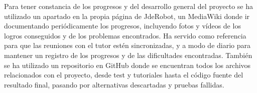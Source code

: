 Para tener constancia de los progresos y del desarrollo general del proyecto se ha utilizado un apartado en la propia página de JdeRobot, un MediaWiki\cite{mediawiki} donde ir documentando periódicamente los progresos, incluyendo fotos y vídeos de los logros conseguidos y de los problemas encontrados. Ha servido como referencia para que las reuniones con el tutor estén sincronizadas, y a modo de diario para mantener un registro de los progresos y de las dificultades encontradas. También se ha utilizado un repositorio en GitHub\cite{mirepo} donde se encuentran todos los archivos relacionados con el proyecto, desde test y tutoriales hasta el código fuente del resultado final, pasando por alternativas descartadas y pruebas fallidas.





























